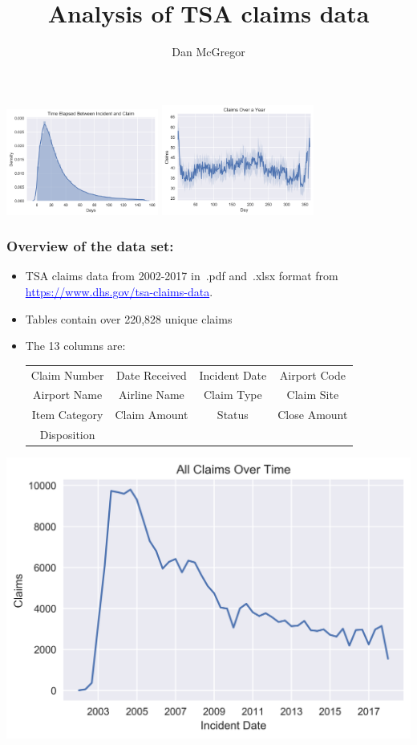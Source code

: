 \documentclass{beamer}
\title{Analysis of TSA claims data}
\author{Dan McGregor}
\date{}
\begin{document}
\begin{frame}
	\titlepage{}
	\includegraphics[keepaspectratio, width = 5cm]{../plots/wait_time}
	\hspace{1cm}
	\includegraphics[keepaspectratio, width = 5cm]{../plots/avg_year_day}
\end{frame}

\begin{frame}
	\frametitle{Overview of the data set:}
	\begin{itemize}
		\item TSA claims data from 2002-2017  in~.pdf and~.xlsx format from \textcolor{blue}{\ul{https://www.dhs.gov/tsa-claims-data}}.

		\item Tables contain over 220,828 unique claims

		\item The 13 columns are:
			\begin{tabular}{c c c c}
				Claim Number & Date Received & Incident Date & Airport Code\\
				Airport Name & Airline Name & Claim Type & Claim Site\\
				Item Category & Claim Amount & Status & Close Amount\\
				Disposition
			\end{tabular}
	\end{itemize}
\end{frame}

\begin{frame}
	\includegraphics[keepaspectratio, width = \textwidth, height = \textheight]{../plots/all_claims}
\end{frame}
\end{document}
